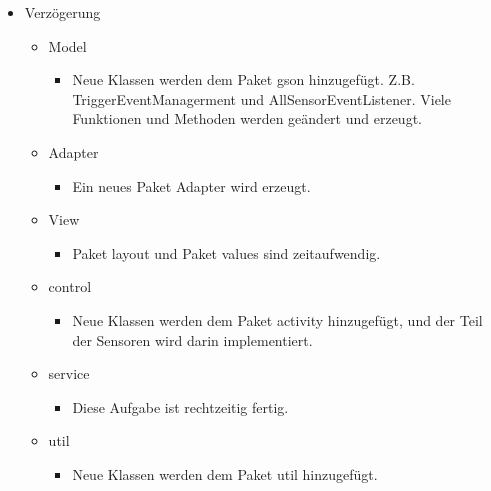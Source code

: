 \documentclass[a4paper]{scrreprt}
\begin{document}
        \begin{itemize}
         \item Verzögerung
                 \begin{itemize}
                    \item Model
                    \begin{itemize}
                        \item Neue Klassen werden dem Paket gson hinzugefügt. Z.B. TriggerEventManagerment und AllSensorEventListener. Viele Funktionen und Methoden werden geändert und erzeugt.
                     \end{itemize}
                  \end{itemize}
                  \begin{itemize}
                        \item Adapter
                            \begin{itemize}
                            \item Ein neues Paket Adapter wird erzeugt.
                            \end{itemize}
                  \end{itemize}
                  \begin{itemize}
                        \item View
                            \begin{itemize}
                            \item Paket layout und Paket values sind zeitaufwendig.
                            \end{itemize}
                  \end{itemize}
                   \begin{itemize}
                        \item control
                            \begin{itemize}
                            \item Neue Klassen werden dem Paket activity hinzugefügt, und der Teil der Sensoren wird darin implementiert.
                            \end{itemize}
                  \end{itemize}
                  \begin{itemize}
                        \item service
                            \begin{itemize}
                            \item  Diese Aufgabe ist rechtzeitig fertig.
                            \end{itemize}
                  \end{itemize}
                  \begin{itemize}
                        \item util
                            \begin{itemize}
                            \item Neue Klassen werden dem Paket util hinzugefügt.
                            \end{itemize}
                  \end{itemize}


\end{itemize}
\end{document}
